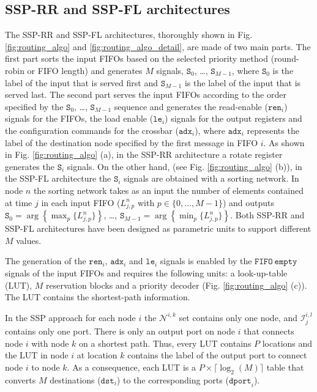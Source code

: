 \documentclass[10pt,twocolumn,journal]{IEEEtran}
\begin{document}
\subsection{SSP-RR and SSP-FL architectures}
\label{subsec:SSP}
The SSP-RR and SSP-FL architectures, thoroughly shown in Fig. \ref{fig:routing_algo} and \ref{fig:routing_algo_detail}, 
are made of two main parts. 
The first part sorts the input FIFOs based on the selected priority method (round-robin or FIFO length) and 
generates $M$ signals, $\mathtt{S}_0$, \dots, $\mathtt{S}_{M-1}$, where 
$\mathtt{S}_0$ is the label of the input that is served first and 
$\mathtt{S}_{M-1}$ is the label of the input that is served last. 
The second part serves the input FIFOs according to the order specified by the 
$\mathtt{S}_0$, \dots, $\mathtt{S}_{M-1}$  sequence and 
generates the read-enable ($\mathtt{ren}_i$) signals for the FIFOs, 
the load enable ($\mathtt{le}_i$) signals for the output registers and 
the configuration commands for the crossbar ($\mathtt{adx}_i$), 
where  $\mathtt{adx}_i$ represents the label of the destination node specified 
by the first message in FIFO $i$.
As shown in Fig. \ref{fig:routing_algo} (a), 
in the SSP-RR architecture a rotate register generates the $\mathtt{S}_i$ 
signals. On the other hand, (see Fig. \ref{fig:routing_algo} (b)), in the SSP-FL architecture the $\mathtt{S}_i$ 
signals are obtained with a sorting network. In node $n$ the sorting network takes as an input the number of elements 
contained at time $j$ in each input FIFO ($L^n_{j,p}$ with $p \in \{0, \dots, M-1\}$) and outputs 
$\mathtt{S}_0 = \arg \left\{ \max_p \{L^n_{j,p}\} \right\}$, \dots, 
$\mathtt{S}_{M-1} = \arg \left\{ \min_p \{L^n_{j,p}\} \right\}$. Both SSP-RR and SSP-FL architectures have been 
designed as parametric units to support different $M$ values.

The generation of the $\mathtt{ren}_i$, $\mathtt{adx}_i$ and $\mathtt{le}_i$ signals is enabled by the 
$\mathtt{FIFO~empty}$ signals of the input FIFOs and requires the following units:  
a look-up-table (LUT), $M$ reservation blocks and a priority decoder (Fig. \ref{fig:routing_algo} (c)). 
The LUT contains the shortest-path information. 

In the SSP approach for each node $i$ the $\mathcal{N}^{i,k}$ set contains only one node, and  
$\mathcal{I}^{i,l}_j$ contains only one port. There is only an output port on node $i$ that connects 
node $i$ with node $k$ on a shortest path. Thus, every LUT contains $P$ locations and the LUT in node $i$ 
at location $k$ contains the label of the output port to connect node $i$ to node $k$. 
As a consequence, each LUT is a $P \times \lceil \log_2(M) \rceil$ table that converts $M$ destinations 
($\mathtt{dst}_i$) to the corresponding ports ($\mathtt{dport}_i$).
\end{document}
